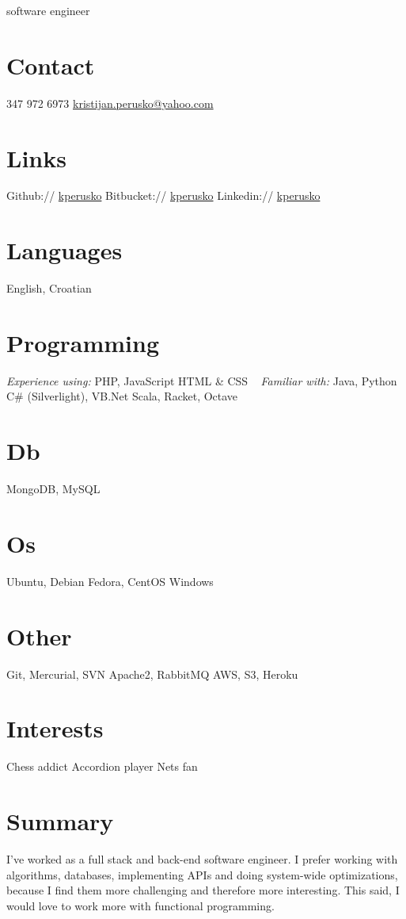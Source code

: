 \documentclass[]{cv}
\begin{document}
       {software engineer}
       
\begin{aside}
  \section{Contact}
    347 972 6973
    \href{mailto:kristijan.perusko@yahoo.com}{kristijan.perusko@yahoo.com}  
  \section{Links}  
    Github:// \href{https://github.com/kperusko}{kperusko}
    Bitbucket:// \href{https://bitbucket.org/kperusko}{kperusko}
    Linkedin:// \href{https://www.linkedin.com/in/kperusko}{kperusko}
  \section{Languages}
    English, Croatian
  \section{Programming}
    \emph{Experience using:}
    PHP, JavaScript
    HTML \& CSS
~     
    \emph{Familiar with:}
    Java, Python
    C\# (Silverlight), VB.Net
    Scala, Racket, Octave
  \section{Db}
    MongoDB, MySQL
  \section{Os}
    Ubuntu, Debian 
    Fedora, CentOS
    Windows
  \section{Other}
    Git, Mercurial, SVN
    Apache2, RabbitMQ
    AWS, S3, Heroku
  \section{Interests}
    Chess addict
    Accordion player
    Nets fan
\end{aside}

\section{Summary}
I've worked as a full stack and back-end software engineer. I prefer working with algorithms, databases, implementing APIs and doing system-wide optimizations, because I find them more challenging and therefore more interesting. This said, I would love to work more with functional programming.
\end{document}
